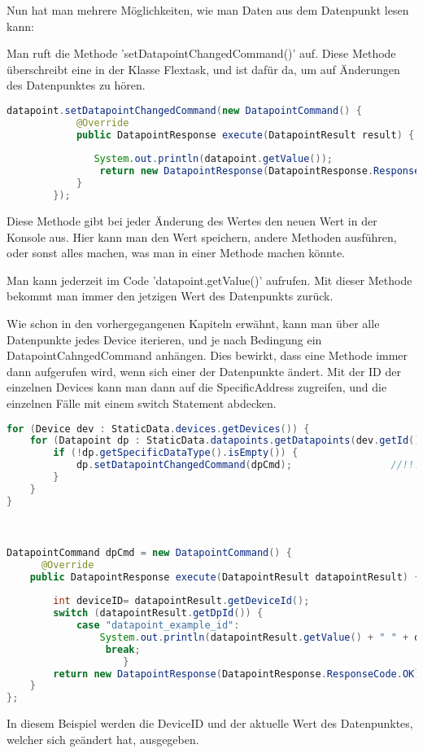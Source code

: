 Nun hat man mehrere Möglichkeiten, wie man Daten aus dem Datenpunkt lesen kann:
\begin{compactenum}
    \item Man ruft die Methode 'setDatapointChangedCommand()' auf. Diese Methode überschreibt eine in der Klasse Flextask, und ist dafür da, um auf Änderungen des Datenpunktes zu hören.
    
    \begin{lstlisting}[language=java,caption=Example datapoint usage,label=lst:impl:foo]
        datapoint.setDatapointChangedCommand(new DatapointCommand() { 
            @Override 
            public DatapointResponse execute(DatapointResult result) { 
         
               System.out.println(datapoint.getValue()); 
                return new DatapointResponse(DatapointResponse.ResponseCode.OK); 
            } 
        }); 
    \end{lstlisting}
    Diese Methode gibt bei jeder Änderung des Wertes den neuen Wert in der Konsole aus. Hier kann man den Wert speichern, andere Methoden ausführen, oder sonst alles machen, was man in einer Methode machen könnte.

    \item Man kann jederzeit im Code 'datapoint.getValue()' aufrufen. Mit dieser Methode bekommt man immer den jetzigen Wert des Datenpunkts zurück.
    \item Wie schon in den vorhergegangenen Kapiteln erwähnt, kann man über alle Datenpunkte jedes Device iterieren, und je nach Bedingung ein DatapointCahngedCommand anhängen. Dies bewirkt, dass eine Methode immer dann aufgerufen wird, wenn sich einer der Datenpunkte ändert. Mit der ID der einzelnen Devices kann man dann auf die SpecificAddress zugreifen, und die einzelnen Fälle mit einem switch Statement abdecken.
    \begin{lstlisting}[language=java,caption=Example multible datapoint usage,label=lst:impl:foo]
        for (Device dev : StaticData.devices.getDevices()) { 
    for (Datapoint dp : StaticData.datapoints.getDatapoints(dev.getId())) { 
        if (!dp.getSpecificDataType().isEmpty()) { 
            dp.setDatapointChangedCommand(dpCmd);                 //!!! 
        } 
    } 
} 

 

DatapointCommand dpCmd = new DatapointCommand() { 
      @Override 
    public DatapointResponse execute(DatapointResult datapointResult) { 
 
        int deviceID= datapointResult.getDeviceId();  
        switch (datapointResult.getDpId()) { 
            case "datapoint_example_id": 
                System.out.println(datapointResult.getValue() + " " + deviceID ); 
                 break; 
                    } 
        return new DatapointResponse(DatapointResponse.ResponseCode.OK); 
    } 
}; 

    \end{lstlisting}
    In diesem Beispiel werden die DeviceID und der aktuelle Wert des Datenpunktes, welcher sich geändert hat, ausgegeben.
\end{compactenum}

